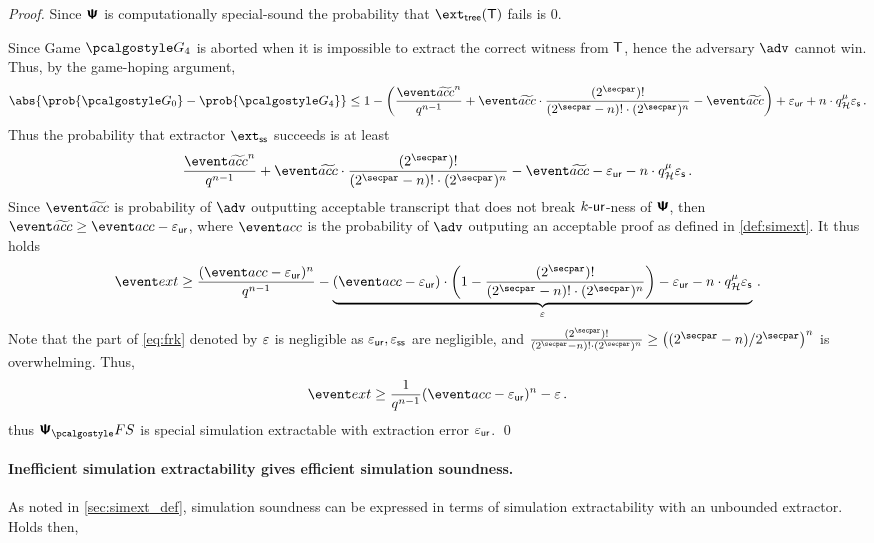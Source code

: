 \documentclass[runningheads,11pt]{llncs}
\begin{document}
\begin{proof}
Since $\bm{\mathsf{\Psi}}$ is computationally special-sound the probability that $\extt(\tree)$
fails is $0$. 

Since Game $\game{4}$ is aborted when it is impossible to extract the correct witness
from $\mathsf{T}$, hence the adversary $\advse$ cannot win.  Thus, by the game-hoping
argument,
\[
	\abs{\prob{\game{0}} - \prob{\game{4}}} \leq 1 -
  \left(\frac{\waccProb^{n}}{q^{n - 1}} + \waccProb \cdot \frac{(2^\secpar)
      !}{(2^\secpar - n)! \cdot (2^\secpar)^{n}} - \waccProb\right) + \epsur + n
  \cdot q_{\ro}^{\mu} \epss\,.
\]
Thus the probability that extractor $\extss$ succeeds is at least
\[
	\frac{\waccProb^{n}}{q^{n - 1}} + 
	\waccProb \cdot
	\frac{(2^\secpar) !}{(2^\secpar - n)! \cdot
        (2^\secpar)^{n}} -
\waccProb - \epsur - n \cdot
q_{\ro}^{\mu} \epss\,.
\]
Since $\waccProb$ is probability of $\advse$ outputting acceptable transcript
that does not break ${k\text{-}\mathsf{ur}}$-ness of $\bm{\mathsf{\Psi}}$, then $\waccProb \geq \accProb -
\epsur$, where $\accProb$ is the probability of $\advse$ outputing an acceptable
proof as defined in \cref{def:simext}. It thus holds
\[
	\label{eq:frk}
	\extProb \geq \frac{(\accProb - \epsur)^{n}}{q^{n - 1}} -
  \underbrace{(\accProb - \epsur) \cdot \left( 1 - \frac{(2^\secpar)
        !}{(2^\secpar - n)! \cdot (2^\secpar)^{n}}\right) - \epsur - n \cdot
    q_{\ro}^{\mu} \epss}_{\eps}\,.
\]
Note that the part of \cref{eq:frk} denoted by $\varepsilon$ is negligible as
$\varepsilon_{\mathsf{ur}}, \varepsilon_{\mathsf{ss}}$ are negligible, and
$\frac{(2^\secpar) !}{(2^\secpar - n)! \cdot (2^\secpar)^{n}} \geq
\left(\infrac{(2^\secpar - n)}{2^\secpar}\right)^{n}$ is overwhelming.  Thus,
\[
	\extProb \geq \frac{1}{q^{n - 1}} (\accProb - \epsur)^{n} -\eps\,.
\] 
thus $\psfs$ is special simulation extractable with extraction error $\varepsilon_{\mathsf{ur}}$.
\qed
\end{proof}

\paragraph{Inefficient simulation extractability gives efficient simulation soundness.}
As noted in \cref{sec:simext_def}, simulation soundness can be expressed in
terms of simulation extractability with an  unbounded extractor. Holds then,
\end{document}
